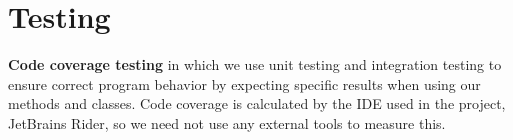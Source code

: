 \chapter{Testing}

\textbf{Code coverage testing} in which we use unit testing and integration testing to ensure correct program behavior by expecting specific results when using our methods and classes. 
Code coverage is calculated by the IDE used in the project, JetBrains Rider, so we need not use any external tools to measure this\cite{rider_test_coverage}.


